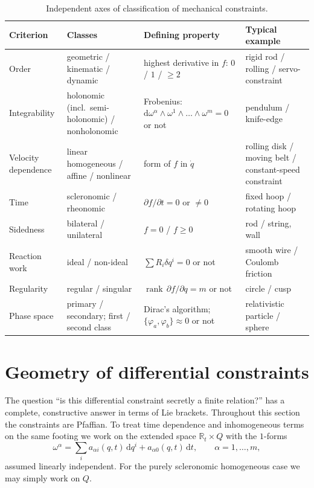 \documentclass[11pt,a4paper]{article}
\theoremstyle{definition}
\theoremstyle{plain}
\theoremstyle{remark}
\newcommand{\R}{\mathbb{R}}
\newcommand{\dd}{\mathrm{d}}
\newcommand{\Pois}[2]{\{#1,#2\}}
\newcommand{\weq}{\approx}                 %
\DeclareMathOperator{\rank}{rank}
\begin{document}
\begin{table}[t]
\centering
\small
\renewcommand{\arraystretch}{1.25}
\begin{tabular}{@{}p{2.9cm}p{3.6cm}p{5.0cm}p{3.1cm}@{}}
\toprule
\textbf{Criterion} & \textbf{Classes} & \textbf{Defining property} & \textbf{Typical example}\\
\midrule
Order & geometric / kinematic / dynamic & highest derivative in $f$: $0$ / $1$ / $\ge2$ & rigid rod / rolling / servo-constraint\\
Integrability & holonomic (incl.\ semi-holonomic) / nonholonomic & Frobenius: $\mathrm{d}\omega^\alpha\wedge\omega^1\wedge\dots\wedge\omega^m=0$ or not & pendulum / knife-edge\\
Velocity dependence & linear homogeneous / affine / nonlinear & form of $f$ in $\dot q$ & rolling disk / moving belt / constant-speed constraint\\
Time & scleronomic / rheonomic & $\partial f/\partial t=0$ or $\neq0$ & fixed hoop / rotating hoop\\
Sidedness & bilateral / unilateral & $f=0$ / $f\ge0$ & rod / string, wall\\
Reaction work & ideal / non-ideal & $\sum R_i\delta q^i=0$ or not & smooth wire / Coulomb friction\\
Regularity & regular / singular & $\rank\,\partial f/\partial q=m$ or not & circle / cusp\\
Phase space & primary / secondary; first / second class & Dirac's algorithm; $\Pois{\varphi_a}{\varphi_b}\weq0$ or not & relativistic particle / sphere\\
\bottomrule
\end{tabular}
\caption{Independent axes of classification of mechanical constraints.}\label{tab:classes}
\end{table}

\section{Geometry of differential constraints}\label{sec:geometry}
The question ``is this differential constraint secretly a finite relation?'' has a
complete, constructive answer in terms of Lie brackets. Throughout this section the
constraints are Pfaffian. To treat time dependence and inhomogeneous terms on the same
footing we work on the extended space $\R_t\times Q$ with the $1$-forms
\begin{equation}\label{eq:forms}
  \omega^\alpha=\sum_i a_{\alpha i}(q,t)\,\dd q^i+a_{\alpha 0}(q,t)\,\dd t,\qquad\alpha=1,\dots,m,
\end{equation}
assumed linearly independent. For the purely scleronomic homogeneous case we may
simply work on $Q$.
\end{document}
